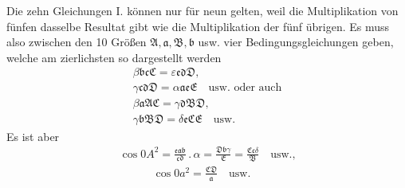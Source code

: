 Die zehn Gleichungen I. können nur für neun gelten, weil die Multiplikation von fünfen dasselbe Resultat gibt wie die Multiplikation der fünf übrigen.
Es muss also zwischen den 10 Größen $\mathfrak{A},\mathfrak{a},\mathfrak{B},\mathfrak{b}$ usw. vier Bedingungsgleichungen geben, welche am zierlichsten so dargestellt werden
\[
\begin{gathered} \beta\mathfrak{b}\mathfrak{c}\mathfrak{C}=\varepsilon\mathfrak{e}\mathfrak{d}\mathfrak{D},\\[9pt] \gamma\mathfrak{c}\mathfrak{d}\mathfrak{D}=\alpha\mathfrak{a}\mathfrak{e}\mathfrak{E}\quad\text{usw. oder auch}\\[9pt] \beta\mathfrak{a}\mathfrak{A}\mathfrak{C}=\gamma\mathfrak{d}\mathfrak{B}\mathfrak{D},\\[9pt] \gamma\mathfrak{b}\mathfrak{B}\mathfrak{D}=\delta\mathfrak{e}\mathfrak{C}\mathfrak{E}\quad\text{usw.} \end{gathered}
\]
Es ist aber
\[
\begin{gathered}\cos 0A^2=\frac{\mathfrak{e}\mathfrak{a}\mathfrak{b}}{\mathfrak{c}\mathfrak{d}}\mathbin{.}\alpha =\frac{\mathfrak{D}\mathfrak{b}\gamma}{\mathfrak{E}} =\frac{\mathfrak{C}\mathfrak{c}\delta}{\mathfrak{B}}\quad\text{usw.,} \\[9pt]\quad{}\qquad\cos 0a^2=\frac{\mathfrak{C}\mathfrak{D}}{\mathfrak{a}}\quad\text{usw.}\end{gathered}
\]

\clearpage
\endgroup
